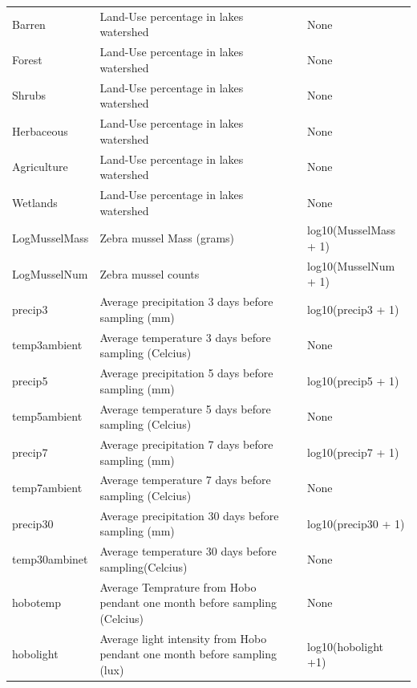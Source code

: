 \begin{table}[!ht]
{\begin{tabular}{lll}
  Barren & Land-Use percentage in lakes watershed & None \\
  Forest & Land-Use percentage in lakes watershed & None \\
  Shrubs & Land-Use percentage in lakes watershed & None \\
  Herbaceous & Land-Use percentage in lakes watershed & None \\
  Agriculture & Land-Use percentage in lakes watershed & None \\
  Wetlands & Land-Use percentage in lakes watershed & None \\
  LogMusselMass & Zebra mussel Mass (grams) & log10(MusselMass + 1) \\
  LogMusselNum & Zebra mussel counts & log10(MusselNum + 1) \\
  precip3 & Average precipitation 3 days before sampling  (mm) & log10(precip3 + 1) \\
  temp3ambient & Average temperature 3 days before sampling (Celcius) & None \\
  precip5 & Average precipitation 5 days before sampling (mm) & log10(precip5 + 1) \\
  temp5ambient & Average temperature 5 days before sampling (Celcius) & None \\
  precip7 & Average precipitation 7 days before sampling (mm) & log10(precip7 + 1) \\
  temp7ambient & Average temperature 7 days before sampling (Celcius) & None \\
  precip30 & Average precipitation 30 days before sampling (mm) & log10(precip30 + 1) \\
  temp30ambinet & Average temperature 30 days before sampling(Celcius) & None \\
  hobotemp & Average Temprature from Hobo pendant one month before sampling (Celcius) & None \\
  hobolight & Average light intensity from Hobo pendant one month before sampling (lux) & log10(hobolight +1) \\
   \hline
\end{tabular}}
\end{table}

